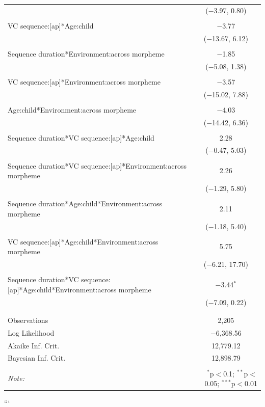 \documentclass[
]{article}
\begin{document}
\begin{table}[!htbp]
\begin{tabular}{@{\extracolsep{5pt}}lc}
  & ($-$3.97, 0.80) \\ 
  & \\ 
 VC sequence:[ap]*Age:child & $-$3.77 \\ 
  & ($-$13.67, 6.12) \\ 
  & \\ 
 Sequence duration*Environment:across morpheme & $-$1.85 \\ 
  & ($-$5.08, 1.38) \\ 
  & \\ 
 VC sequence:[ap]*Environment:across morpheme & $-$3.57 \\ 
  & ($-$15.02, 7.88) \\ 
  & \\ 
 Age:child*Environment:across morpheme & $-$4.03 \\ 
  & ($-$14.42, 6.36) \\ 
  & \\ 
 Sequence duration*VC sequence:[ap]*Age:child & 2.28 \\ 
  & ($-$0.47, 5.03) \\ 
  & \\ 
 Sequence duration*VC sequence:[ap]*Environment:across morpheme & 2.26 \\ 
  & ($-$1.29, 5.80) \\ 
  & \\ 
 Sequence duration*Age:child*Environment:across morpheme & 2.11 \\ 
  & ($-$1.18, 5.40) \\ 
  & \\ 
 VC sequence:[ap]*Age:child*Environment:across morpheme & 5.75 \\ 
  & ($-$6.21, 17.70) \\ 
  & \\ 
 Sequence duration*VC sequence:[ap]*Age:child*Environment:across morpheme & $-$3.44$^{*}$ \\ 
  & ($-$7.09, 0.22) \\ 
  & \\ 
\hline \\[-1.8ex] 
Observations & 2,205 \\ 
Log Likelihood & $-$6,368.56 \\ 
Akaike Inf. Crit. & 12,779.12 \\ 
Bayesian Inf. Crit. & 12,898.79 \\ 
\hline 
\hline \\[-1.8ex] 
\textit{Note:}  & \multicolumn{1}{r}{$^{*}$p$<$0.1; $^{**}$p$<$0.05; $^{***}$p$<$0.01} \\ 
\end{tabular} 
\end{table}

```
\end{document}
